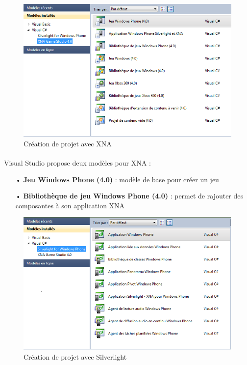 \documentclass[twoside,UTF8]{EPURapport}
\begin{document}
	\begin{figure}[H]
		\center
		\includegraphics[scale=0.6]{images/creaprojetxna.png}
		\caption{Création de projet avec XNA}
	\end{figure}		

\paragraph{}
Visual Studio propose deux modèles pour XNA : 
\begin{itemize}
	\item[•]\textbf{Jeu Windows Phone (4.0)} : modèle de base pour créer un jeu
	\item[•]\textbf{Bibliothèque de jeu Windows Phone (4.0)} : permet de rajouter des composantes à son application XNA
\end{itemize}
	
	\begin{figure}[H]	
		\center
		\includegraphics[scale=0.6]{images/creaprojetsilverlight.png}		
		\caption{Création de projet avec Silverlight}
	\end{figure}
\end{document}
